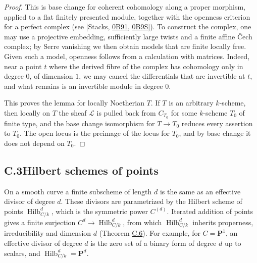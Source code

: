 \documentclass[11pt]{article}
\begin{document}
\begin{proof}[{Proof}]\label{bp136}%
This is base change for coherent cohomology along a proper morphism, applied to a flat finitely presented module, together with the openness criterion for a perfect complex (see [Stacks, \href{https://stacks.math.columbia.edu/tag/0B91}{0B91}, \href{https://stacks.math.columbia.edu/tag/0B9S}{0B9S}]). To construct the complex, one may use a projective embedding, sufficiently large twists and a finite affine Čech complex; by Serre vanishing we then obtain models that are finite locally free. Given such a model, openness follows from a calculation with matrices. Indeed, near a point \(t\) where the derived fibre of the complex has cohomology only in degree \(0\), of dimension \(1\), we may cancel the differentials that are invertible at \(t\), and what remains is an invertible module in degree \(0\).

This proves the lemma for locally Noetherian \(T\). If \(T\) is an arbitrary \(k\)-scheme, then locally on \(T\) the sheaf \(\mathcal L\) is pulled back from \(C_{T_0}\) for some \(k\)-scheme \(T_0\) of finite type, and the base change isomorphism for \(T\to T_0\) reduces every assertion to \(T_0\). The open locus is the preimage of the locus for \(T_0\), and by base change it does not depend on \(T_0\).
\end{proof}


\subsection*{\texorpdfstring{C.3\quad Hilbert schemes of points}{C.3 Hilbert schemes of points}}
\label{bp137}%
\label{bp138}%
On a smooth curve a finite subscheme of length \(d\) is the same as an effective divisor of degree \(d\). These divisors are parametrized by the Hilbert scheme of points \(\operatorname{Hilb}^{d}_{C/k}\), which is the symmetric power \(C^{(d)}\). Iterated addition of points gives a finite surjection \(C^d\to \operatorname{Hilb}^{d}_{C/k}\), from which \(\operatorname{Hilb}^{d}_{C/k}\) inherits properness, irreducibility and dimension \(d\) (Theorem \hyperref[bp139]{C.6}). For example, for \(C=\mathbf P^1\), an effective divisor of degree \(d\) is the zero set of a binary form of degree \(d\) up to scalars, and \(\operatorname{Hilb}^{d}_{C/k}=\mathbf P^d\).
\end{document}
